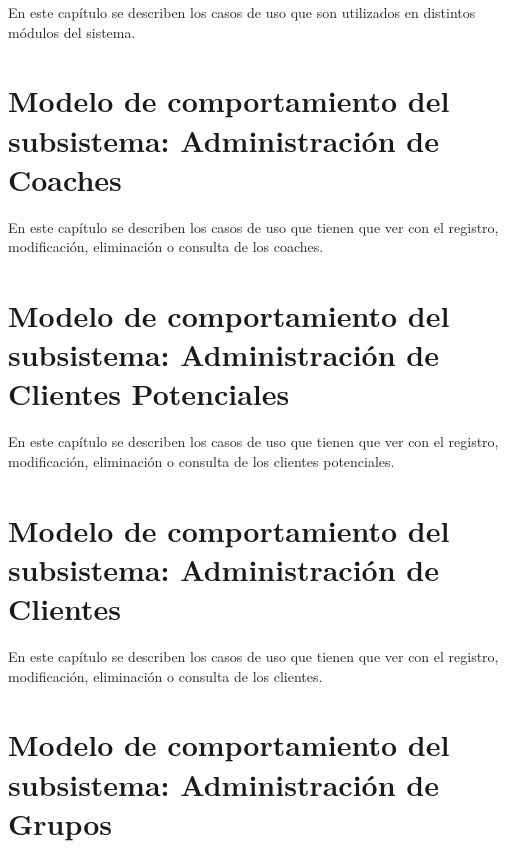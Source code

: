 \documentclass[10pt]{book}
\begin{document}
	En este capítulo se describen los casos de uso que son utilizados en distintos módulos
	del sistema.\bigskip

\chapter{Modelo de comportamiento del subsistema: Administración de Coaches}
\label{chp:administracionCoaches}

	En este capítulo se describen los casos de uso que tienen que ver con el registro, modificación, eliminación o consulta de los coaches.\bigskip

\chapter{Modelo de comportamiento del subsistema: Administración de Clientes Potenciales}
\label{chp:administracionClientesPotenciales}

	En este capítulo se describen los casos de uso que tienen que ver con el registro, modificación, eliminación o consulta de los clientes potenciales.\bigskip


\chapter{Modelo de comportamiento del subsistema: Administración de Clientes}
\label{chp:administracionClientes}

	En este capítulo se describen los casos de uso que tienen que ver con el registro, modificación, eliminación o consulta de los clientes.\bigskip

\chapter{Modelo de comportamiento del subsistema: Administración de Grupos}
\label{chp:administracionGrupos}
\end{document}
